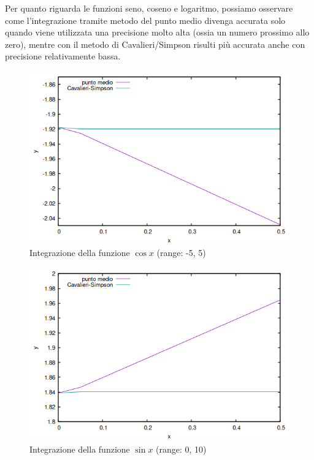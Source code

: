 \documentclass{article}
\begin{document}
Per quanto riguarda le funzioni seno, coseno e logaritmo, possiamo osservare come l'integrazione tramite metodo del punto medio divenga accurata solo quando viene 
utilizzata una precisione molto alta (ossia un numero prossimo allo zero), mentre con il metodo di Cavalieri/Simpson risulti più accurata anche con precisione relativamente bassa.
\begin{figure}[ht]
   \centering
   \includegraphics*[scale=.5]{../grafici/immagini/coseno_integrazione.png}
   \caption{Integrazione della funzione $\cos x$ (range: -5, 5)}
\end{figure}
\begin{figure}[ht]
   \centering
   \includegraphics*[scale=.5]{../grafici/immagini/seno_integrazione.png}
   \caption{Integrazione della funzione $\sin x$ (range: 0, 10)}
\end{figure}
\end{document}
